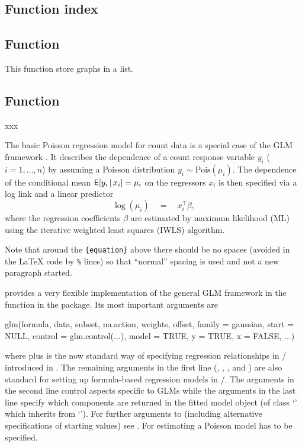 \documentclass[article]{jss}
\newcommand{\class}[1]{`\code{#1}'}
\newcommand{\fct}[1]{\code{#1()}}
\begin{document}

\subsection{Function index} \label{sec:funct_index}

\subsection{Function } \label{sec:funct_list_dec}

This function store graphs in a list.

\subsection{Function } \label{sec:funct_etc}

xxx


The basic Poisson regression model for count data is a special case of the GLM
framework \cite{McCullagh+Nelder:1989}. It describes the dependence of a count
response variable $y_i$ ($i = 1, \dots, n$) by assuming a Poisson distribution
$y_i \sim \mathrm{Pois}(\mu_i)$. The dependence of the conditional mean
$\mathsf{E}[y_i \, | \, x_i] = \mu_i$ on the regressors $x_i$ is then specified via a
log link and a linear predictor
%
\begin{equation} \label{eq:mean}
\log(\mu_i) \quad = \quad x_i^\top \beta,
\end{equation}
%
where the regression coefficients $\beta$ are estimated by maximum likelihood
(ML) using the iterative weighted least squares (IWLS) algorithm.

\begin{leftbar}
Note that around the \verb|{equation}| above there should be no spaces (avoided
in the {\LaTeX} code by \verb|%| lines) so that ``normal'' spacing is used and
not a new paragraph started.
\end{leftbar}

 provides a very flexible implementation of the general GLM
framework in the function \fct{glm} \citep{Chambers+Hastie:1992} in the
 package. Its most important arguments are
\begin{Code}
glm(formula, data, subset, na.action, weights, offset,
  family = gaussian, start = NULL, control = glm.control(...),
  model = TRUE, y = TRUE, x = FALSE, ...)
\end{Code}
where  plus  is the now standard way of specifying
regression relationships in / introduced in
\cite{Chambers+Hastie:1992}. The remaining arguments in the first line
(, , , and ) are also
standard  for setting up formula-based regression models in
/. The arguments in the second line control aspects
specific to GLMs while the arguments in the last line specify which components
are returned in the fitted model object (of class \class{glm} which inherits
from \class{lm}). For further arguments to \fct{glm} (including alternative
specifications of starting values) see . For estimating a Poisson
model  has to be specified.
\end{document}
